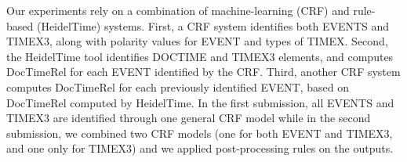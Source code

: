 Our experiments rely on a combination of machine-learning (CRF) and rule-based (HeidelTime) systems. First, a CRF system identifies both EVENTS and TIMEX3, along with polarity values for EVENT and types of TIMEX. Second, the HeidelTime tool  identifies DOCTIME and TIMEX3 elements, and computes DocTimeRel for each EVENT identified by the CRF. Third, another CRF system computes DocTimeRel for each previously identified EVENT, based on DocTimeRel computed by HeidelTime. In the first submission, all EVENTS and TIMEX3 are identified through one general CRF model while in the second submission, we combined two CRF models (one for both EVENT and TIMEX3, and one only for TIMEX3) and we applied post-processing rules on the outputs.
